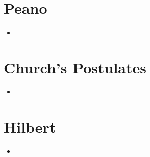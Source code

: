 \documentclass[a4paper,10pt]{article}
\begin{document}
\section{Peano}
\begin{itemize}
 \item 
\end{itemize}

\section{Church's Postulates}
\begin{itemize}
 \item 
\end{itemize}

\section{Hilbert}
\begin{itemize}
 \item 
\end{itemize}
\end{document}
